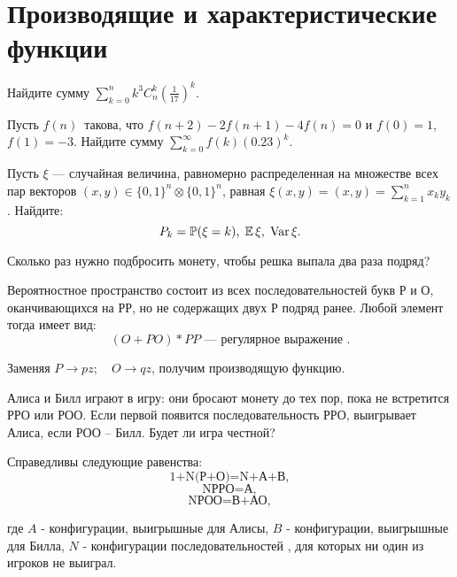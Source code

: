 \section{Производящие и характеристические функции}

\begin{problem}
Найдите сумму $\sum\limits_{k=0}^n k^3 C_n^k \left(\frac{1}{17}\right)^k$.
\end{problem}

\begin{problem}
Пусть $f(n)$~такова, что $ f(n+2) - 2f(n+1) - 4f(n) = 0 $ и $ f(0) = 1 $, $ f(1) = -3 $. Найдите сумму $ \sum\limits_{k=0}^{\infty} f(k) (0.23)^k $.
\end{problem}

\begin{problem}
Пусть $\xi$ --- случайная величина, равномерно распределенная на множестве всех пар векторов 
$(x,y)\in \{ 0,1\}^n\otimes \{ 0,1\}^n$, равная $\xi(x,y)=(x,y)=\sum\limits_{k=1}^{n} x_k y_k$. Найдите: 
$$
P_k={\mathbb P}(\xi=k), \; {\mathbb E}\,\xi, \; \mathop{\mathrm{Var}}\nolimits \xi . 
$$
\end{problem}

\begin{problem}
Сколько раз нужно подбросить монету, чтобы решка выпала два раза подряд?
\end{problem}

\begin{ordre}
Вероятностное пространство состоит из всех 
последовательностей букв Р и О, оканчивающихся на РР, но не содержащих двух 
Р подряд ранее. Любой элемент тогда имеет вид:
$$
(O+PO)*PP \text{ --- регулярное выражение }.
$$

Заменяя ${P}\to pz;\quad {O}\to qz$, получим производящую функцию.
\end{ordre}


\begin{problem}
Алиса и Билл играют в игру: они 
бросают монету до тех пор, пока не встретится РРО или РОО. Если первой 
появится последовательность РРО, выигрывает Алиса, если РОО -- Билл. Будет 
ли игра честной?
\end{problem}

\begin{ordre}

Справедливы следующие равенства:
\[
\mbox{1+N(Р+О)=N+А+В},
\]
\[
\mbox{NРРО=А},
\]
\[
\mbox{NРОО=В+АО},
\]

где $A$ - конфигурации, выигрышные для Алисы, $B$ -  конфигурации, выигрышные для Билла, $N$ - конфигурации последовательностей , для которых ни один из игроков не выиграл.

\end{ordre}


